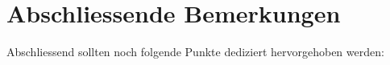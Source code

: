 \section{Abschliessende Bemerkungen}
\label{sec:bemerkungen}

Abschliessend sollten noch folgende Punkte dediziert hervorgehoben werden: